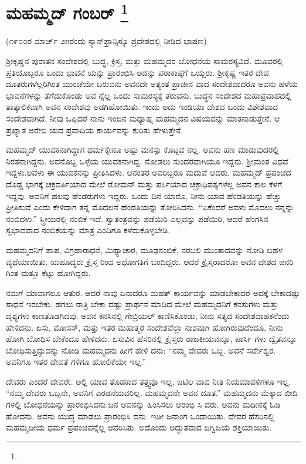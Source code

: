 
\chapter[ಮಹಮ್ಮದ್ ಗಂಬರ್ ]{ಮಹಮ್ಮದ್ ಗಂಬರ್ \protect\footnote{}}

\centerline{(೧೯೦೦ರ ಮಾರ್ಚ್​ ೨೫ರಂದು ಸ್ಯಾನ್​ಫ್ರಾನ್ಸಿಸ್ಕೊ ಪ್ರದೇಶದಲ್ಲಿ ನೀಡಿದ ಭಾಷಣ)}

ಶ‍್ರೀಕೃಷ್ಣನ ಪುರಾತನ ಸಂದೇಶದಲ್ಲಿ ಬುದ್ಧ, ಕ್ರಿಸ್ತ, ಮತ್ತು ಮಹಮ್ಮದರ ಬೋಧನೆಯ ಸಾಮರಸ್ಯವಿದೆ. ಮೂವರಲ್ಲಿ ಪ್ರತಿಯೊಬ್ಬರೂ ಒಂದು ಭಾವನೆ ಯನ್ನು ಪ್ರಾರಂಭಿಸಿ ಅದನ್ನು ಪರಾಕಾಷ್ಠೆಗೆ ಒಯ್ದರು. ಶ‍್ರೀಕೃಷ್ಣ ಇತರ ದೇವ ದೂತರುಗಳೆಲ್ಲರಿಗಿಂತ ಮುಂಚೆಯೇ ಬರುವನು ಅವನದೇ ಅತ್ಯಂತ ಪ್ರಾಚೀನ ವಾದ ಸಂದೇಶವಾದರೂ ಅವನು ಹಳೆಯ ಭಾವನೆಗಳನ್ನು ತೆಗೆದುಕೊಂಡು ಅವ ನ್ನೆಲ್ಲ ಒಂದು ಸಾಮರಸ್ಯಕ್ಕೆ ತರುವನು. ಬುದ್ಧನ ಸಂದೇಶದ ಮಹಾಪ್ರವಾಹದಲ್ಲಿ ತಾತ್ಕಾಲಿಕವಾಗಿ ಅವನ ಸಂದೇಶವು ಅಡಗಿಹೋಯಿತು. ಇಂದು ಅದು ಇಂಡಿಯಾ ದೇಶದ ಒಂದು ವಿಶೇಶವಾದ ಸಂದೇಶವಾಗಿದೆ. ನೀವು ಒಪ್ಪಿದರೆ ನಾನು ಇಂದಿನ ಮಧ್ಯಾಹ್ನ ಮಹಮ್ಮದನ ವಿಷಯವನ್ನು ಮಾತನಾಡುತ್ತೇನೆ. ಆ ಪ್ರಖ್ಯಾತ ಅರೇಬಿ ಯದ ಪ್ರವಾದಿಯ ಕಾರ್ಯವನ್ನು ಕುರಿತು ಹೇಳುತ್ತೇನೆ.

ಮಹಮ್ಮದ್​ ಯುವಕನಾಗಿದ್ದಾಗ ಧರ್ಮಕ್ಕೇನೂ ಅಷ್ಟು ಮನಸ್ಸು ಕೊಟ್ಟವ ನಲ್ಲ. ಅವನು ಹಣ ಮಾಡುವುದರಲ್ಲಿ ನಿರತನಾಗಿದ್ದನು. ಅವನೊಬ್ಬ ಒಳ್ಳೆಯ ಯುವಕನಾಗಿದ್ದ. ನೋಡಲು ಸುಂದರವಾಗಿಯೂ ಇದ್ದನು. ಶ‍್ರೀಮಂತ ವಿಧವೆ ಇದ್ದಳು.ಅವಳು ಈ ಯುವಕನನ್ನು ಪ್ರೀತಿಸಿದಳು. ಆನಂತರ ಅವರಿಬ್ಬರೂ ಮದುವೆ ಆದರು. ಮಹಮ್ಮದ್​ ಪ್ರಪಂಚದ ದೊಡ್ಡ ಭಾಗಕ್ಕೆ ಚಕ್ರವರ್ತಿಯಾದ ಮೇಲೆ ರೋಮನ್​ ಮತ್ತು ಪರ್ಸಿಯಾದ ಚಕ್ರಾಧಿಪತ್ಯಗಳೆಲ್ಲ ಅವನ ಕಾಲ ಕೆಳಗೆ ಇದ್ದವು. ಅವನಿಗೆ ಹಲವು ಹೆಂಡರುಗಳು ಇದ್ದರು. ಒಂದು ದಿನ ಯಾರೊ, ನೀನು ಯಾವ ಹೆಂಡತಿಯನ್ನು ಹೆಚ್ಚು ಪ್ರೀತಿಸುವೆ ಎಂದು ಕೇಳಿದಾಗ ತನ್ನ ಮೊದಲನೆ ಹೆಂಡತಿಯನ್ನು ತೋರಿಸಿದನು. “ಏಕೆಂದರೆ ಅವಳು ಮೊದಲು ನನ್ನನ್ನು ನಂಬಿದಳು.” ಸ್ತ್ರೀಯರಲ್ಲಿ ನಂಬಿಕೆ ಇದೆ. ಸ್ವಾತಂತ್ರವನ್ನು ಪಡೆಯಿರಿ ಎಲ್ಲವನ್ನು ಪಡೆಯಿರಿ, ಆದರೆ ಹೆಂಗಸಿನ ಸ್ವಭಾವವಾದ ನಂಬಿಕೆಯನ್ನು ಮಾತ್ರ ಎಂದಿಗೂ ಕಳೆದುಕೊಳ್ಳಬೇಡಿ.

ಮಹಮ್ಮದನಿಗೆ ಪಾಪ, ವಿಗ್ರಹಾರಾಧನೆ, ಮಿಥ್ಯಾಚಾರ, ಮೂಢನಂಬಿಕೆ, ನರಬಲಿ ಮುಂತಾದವನ್ನು ನೋಡಿ ಬಹಳ ವ್ಯಥೆಯಾಯಿತು. ಯಹೂದ್ಯರು ಕ್ರೈಸ್ತ ರಿಂದ ಅಧೋಗತಿಗೆ ಬಂದಿದ್ದರು. ಆದರೆ ಕ್ರೈಸ್ತರಾದರೋ ಅವನ ದೇಶದ ಜನರಿ ಗಿಂತ ಮತ್ತೂ ಕೆಟ್ಟು ಹೋಗಿದ್ದರು.

ನಮಗೆ ಯಾವಾಗಲೂ ಆತುರ. ಆದರೆ ನಾವು ಏನಾದರೂ ಮಹತ್​ ಕಾರ್ಯವನ್ನು ಮಾಡಬೇಕಾದರೆ ಅದಕ್ಕೆ ಬೇಕಾದಷ್ಟು ಸಾಧನೆ ಇರಬೇಕು. ಹಗಲು ರಾತ್ರಿ ಬೇಕಾ ದಷ್ಟು ಪ್ರಾರ್ಥನೆ ಮಾಡಿದ ಮೇಲೆ ಮಹಮ್ಮದನಿಗೆ ಕನಸುಗಳು ಮತ್ತು ದೃಶ್ಯಗಳು ಕಾಣತೊಡಗಿದವು. ಅವನ ಕನಸಿನಲ್ಲಿ ಗೇಬ್ರಿಯಲ್​ ಕಾಣಿಸಿಕೊಂಡು, ನೀನು ಸತ್ಯದ ಸಂದೇಶವಾಹಕನೆಂದು ಹೇಳಿದನು. ಏಸು, ಮೋಸಸ್​, ಮತ್ತು ಇತರ ಮಹಾತ್ಮರ ಸಂದೇಶವೆಲ್ಲಾ ನಾಶವಾಗಿ ಹೋಗಿರುವುದೆಂದೂ, ನೀನು ಹೋಗಿ ಬೋಧಿಸ ಬೇಕೆಂದೂ ಹೇಳಿದನು. ಏಸುವಿನ ಹೆಸರಿನಲ್ಲಿ ಕ್ರೈಸ್ತರು ರಾಜಕೀಯವನ್ನೂ, ಪಾರ್ಸಿ ಗಳು ದ್ವೈತವನ್ನೂ ಬೋಧಿಸುತ್ತಿದ್ದುದನ್ನು ನೋಡಿ ಮಹಮ್ಮದನು ಹೀಗೆ ಹೇಳಿ ದನು: “ನಮ್ಮ ದೇವರು ಒಬ್ಬ. ಅವನೆ ಸರ್ವೇಶ್ವರ. ಅವನಿಗೂ ಇತರ ದೇವತೆ ಗಳಿಗೂ ಹೋಲಿಕೆಯೇ ಇಲ್ಲ.”

ದೇವರು ಎಂದರೆ ದೇವರೇ. ಅಲ್ಲಿ ಯಾವ ತೊಡಕಾದ ತತ್ತ್ವವೂ ಇಲ್ಲ, ಜಟಿಲ ವಾದ ನೀತಿ ನಿಯಮಾವಳಿಗಳೂ ಇಲ್ಲ. “ನಮ್ಮ ದೇವರು ಒಬ್ಬನೇ, ಅವನಿಗೆ ಎರಡನೆಯವರಿಲ್ಲ. ಮಹಮ್ಮದನೇ ಅವನ ದೂತ.” ಮಹಮ್ಮದನು ಮೆಕ್ಕಾದ ಬೀದಿ ಗಳಲ್ಲಿ ಬೋಧನೆಯನ್ನು ಪ್ರಾರಂಭಿಸಿದನು.ಜನ ಅವನನ್ನು ಹಿಂಸಿಸಲು ಆರಂಭಿ ಸಿ ದರು. ಅವನು ಮದೀನಕ್ಕೆ ಓಡಿ ಹೋದನು. ಅವನು ಯುದ್ಧ ಮಾಡಲು ಪ್ರಾರಂಭಿಸಿ ದನು. ಇಡೀ ಜನಾಂಗ ಒಂದಾಯಿತು. ದೇವರ ಹೆಸರಿನಲ್ಲಿ ಮಹಮ್ಮದೀಯ ಧರ್ಮ ಪ್ರಪಂಚವನ್ನೆಲ್ಲ ಆವರಿಸಿತು. ಅದೊಂದು ಅದ್ಭುತವಾದ ದಿಗ್ವಿಜಯ ಶಕ್ತಿಯಾಯಿತು.

